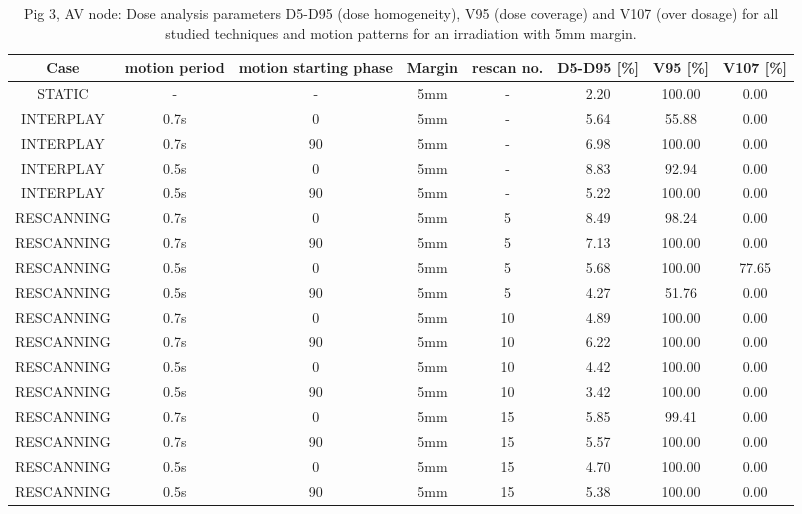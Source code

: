 \begin{table}[H]
  \centering
  \tiny
  \caption{Pig 3, AV node: Dose analysis parameters D5-D95 (dose homogeneity), V95 (dose coverage) and V107 (over dosage) for all studied 
  techniques and motion patterns for an irradiation with 5mm margin.}
  \begin{tabular}{|c||c|c|c|c||c|c|c|}
    \hline\hline
    Case & motion period & motion starting phase & Margin & rescan no. & D5-D95 [\%] & V95 [\%] & V107 [\%] \\
    \hline \hline
STATIC & - & - & 5mm & - & 2.20 & 100.00 & 0.00\\
\hline \hline
INTERPLAY & 0.7s & 0 & 5mm & - & 5.64 & 55.88 & 0.00\\
INTERPLAY & 0.7s & 90 & 5mm & - & 6.98 & 100.00 & 0.00\\
INTERPLAY & 0.5s & 0 & 5mm & - & 8.83 & 92.94 & 0.00\\
INTERPLAY & 0.5s & 90 & 5mm & - & 5.22 & 100.00 & 0.00\\
\hline \hline
RESCANNING & 0.7s & 0 & 5mm & 5 & 8.49 & 98.24 & 0.00\\
RESCANNING & 0.7s & 90 & 5mm & 5 & 7.13 & 100.00 & 0.00\\
RESCANNING & 0.5s & 0 & 5mm & 5 & 5.68 & 100.00 & 77.65\\
RESCANNING & 0.5s & 90 & 5mm & 5 & 4.27 & 51.76 & 0.00\\
\hline
RESCANNING & 0.7s & 0 & 5mm & 10 & 4.89 & 100.00 & 0.00\\
RESCANNING & 0.7s & 90 & 5mm & 10 & 6.22 & 100.00 & 0.00\\
RESCANNING & 0.5s & 0 & 5mm & 10 & 4.42 & 100.00 & 0.00\\
RESCANNING & 0.5s & 90 & 5mm & 10 & 3.42 & 100.00 & 0.00\\
\hline
RESCANNING & 0.7s & 0 & 5mm & 15 & 5.85 & 99.41 & 0.00\\
RESCANNING & 0.7s & 90 & 5mm & 15 & 5.57 & 100.00 & 0.00\\
RESCANNING & 0.5s & 0 & 5mm & 15 & 4.70 & 100.00 & 0.00\\
RESCANNING & 0.5s & 90 & 5mm & 15 & 5.38 & 100.00 & 0.00\\
    \hline\hline 
  \end{tabular}
  \label{tab:Pig3_AV}
\end{table}

\vspace*{-0.6cm}

